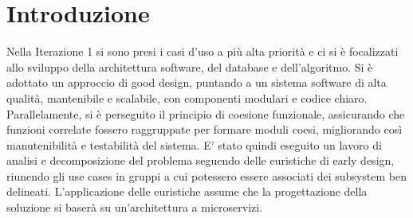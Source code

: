 \section{Introduzione}
Nella Iterazione 1 si sono presi i casi d'uso a più alta priorità e ci si è focalizzati allo sviluppo della architettura software, del database e dell'algoritmo. 
Si è adottato un approccio di good design, puntando a un sistema software di alta qualità, mantenibile e scalabile, con componenti modulari e codice chiaro. Parallelamente, si è perseguito il principio di coesione funzionale, assicurando che funzioni correlate fossero raggruppate per formare moduli coesi, migliorando così manutenibilità e testabilità del sistema. E’ stato quindi eseguito un lavoro di analisi e decomposizione del problema seguendo delle euristiche di early design, riunendo gli use cases in gruppi a cui potessero essere associati dei subsystem ben delineati. L’applicazione delle euristiche assume che la progettazione della soluzione si baserà su un’architettura a microservizi.
\clearpage
